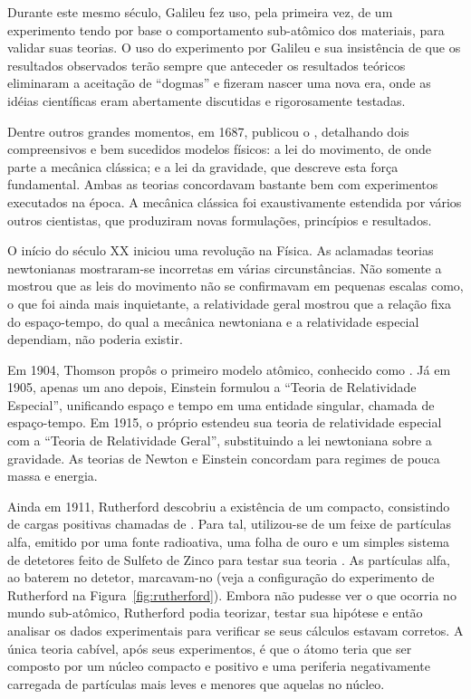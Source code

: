 Durante este mesmo século, Galileu fez uso, pela primeira vez, de um
experimento tendo por base o comportamento sub-atômico dos materiais, para
validar suas teorias. O uso do experimento por Galileu e sua insistência de
que os resultados observados terão sempre que anteceder os resultados teóricos
eliminaram a aceitação de ``dogmas'' e fizeram nascer uma nova era, onde as
idéias científicas eram abertamente discutidas e rigorosamente testadas.

Dentre outros grandes momentos, em 1687,  publicou o
, detalhando dois compreensivos e bem sucedidos
modelos físicos: a lei do movimento, de onde parte a mecânica clássica; e a
lei da gravidade, que descreve esta força fundamental. Ambas as teorias
concordavam bastante bem com experimentos executados na época. A mecânica
clássica foi exaustivamente estendida por vários outros cientistas, que
produziram novas formulações, princípios e resultados.

O início do século XX iniciou uma revolução na Física. As aclamadas teorias
newtonianas mostraram-se incorretas em várias circunstâncias. Não somente a
 mostrou que as leis do movimento não se confirmavam em
pequenas escalas como, o que foi ainda mais inquietante, a relatividade geral
mostrou que a relação fixa do espaço-tempo, do qual a mecânica newtoniana e a
relatividade especial dependiam, não poderia existir.

Em 1904, Thomson propôs o primeiro modelo atômico, conhecido como
. Já em 1905, apenas um ano depois, Einstein formulou a
``Teoria de Relatividade Especial'', unificando espaço e tempo em uma entidade
singular, chamada de espaço-tempo. Em 1915, o próprio estendeu sua teoria de
relatividade especial com a ``Teoria de Relatividade Geral'', substituindo a
lei newtoniana sobre a gravidade. As teorias de Newton e Einstein concordam
para regimes de pouca massa e energia.

Ainda em 1911, Rutherford descobriu a existência de um 
compacto, consistindo de cargas positivas chamadas de . Para tal,
utilizou-se de um feixe de partículas alfa, emitido por uma fonte radioativa,
uma folha de ouro e um simples sistema de detetores feito de Sulfeto de Zinco
para testar sua teoria \cite{halliday}. As partículas alfa, ao baterem no
detetor, marcavam-no (veja a configuração do experimento de Rutherford na
Figura~\ref{fig:rutherford}). Embora não pudesse ver o que ocorria no mundo
sub-atômico, Rutherford podia teorizar, testar sua hipótese e então analisar
os dados experimentais para verificar se seus cálculos estavam corretos. A
única teoria cabível, após seus experimentos, é que o átomo teria que ser
composto por um núcleo compacto e positivo e uma periferia negativamente
carregada de partículas mais leves e menores que aquelas no núcleo.

